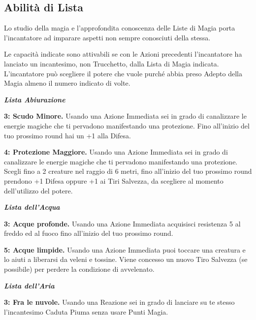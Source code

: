 \begin{multicols}{2}
\subsection{Abilità di Lista}\label{abilitadilista}\hypertarget{abilitadilista}{}


Lo studio della magia e l'approfondita conoscenza delle Liste di Magia porta l'incantatore ad imparare aspetti non sempre conosciuti della stessa.

Le capacità indicate sono attivabili se con le Azioni precedenti l'incantatore ha lanciato un incantesimo, non Trucchetto, dalla Lista di Magia indicata. L'incantatore può scegliere il potere che vuole purché abbia preso Adepto della Magia almeno il numero indicato di volte.

\emph{\textbf{Lista Abiurazione}}

\textbf{3: Scudo Minore.} Usando una Azione Immediata sei in grado di canalizzare le energie magiche che ti pervadono manifestando una protezione. Fino all'inizio del tuo prossimo round hai un +1 alla Difesa.

\textbf{4: Protezione Maggiore.} Usando una Azione Immediata sei in grado di canalizzare le energie magiche che ti pervadono manifestando una protezione. Scegli fino a 2 creature nel raggio di 6 metri, fino all'inizio del tuo prossimo round prendono +1 Difesa oppure +1 ai Tiri Salvezza, da scegliere al momento dell'utilizzo del potere.

\emph{\textbf{Lista dell'Acqua}}

\textbf{3: Acque profonde.} Usando una Azione Immediata acquisisci resistenza 5 al freddo ed al fuoco fino all'inizio del tuo prossimo round.

\textbf{5: Acque limpide.} Usando una Azione Immediata puoi toccare una creatura e lo aiuti a liberarsi da veleni e tossine. Viene concesso un nuovo Tiro Salvezza (se possibile) per perdere la condizione di avvelenato.

\emph{\textbf{Lista dell'Aria}}

\textbf{3: Fra le nuvole.} Usando una Reazione sei in grado di lanciare su te stesso l'incantesimo Caduta Piuma senza usare Punti Magia.


\end{multicols}
